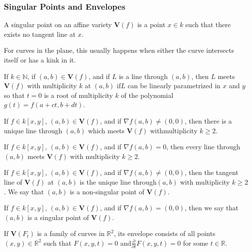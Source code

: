             \subsubsection{Singular Points and Envelopes}
                    \begin{definition}
                    A singular point on an affine variety $\mathbf{V}(f)$ is a point $x\in k$ such that there exists no tangent line at $x$.
                    \end{definition}
                    For curves in the plane, this usually happens when either the curve intersects itself or has a kink in it.
                    \begin{definition}
                    If $k\in \mathbb{N}$, if $(a,b)\in \mathbf{V}(f)$, and if $L$ is a line through $(a,b)$, then $L$ meets $\mathbf{V}(f)$ with multiplicity $k$ at $(a,b)$ if$L$ can be linearly parametrized in $x$ and $y$ so that $t=0$ is a root of multiplicity $k$ of the polynomial $g(t) = f(a+ct,b+dt)$.
                    \end{definition}
                    \begin{theorem}
                    If $f\in k[x,y]$, $(a,b) \in \mathbf{V}(f)$, and if $\nabla f(a,b) \ne (0,0)$, then there is a unique line through $(a,b)$ which meets $\mathbf{V}(f)$ withmultiplicity $k\geq 2$.
                    \end{theorem}
                    \begin{theorem}
                    If $f\in k[x,y]$, $(a,b) \in \mathbf{V}(f)$, and if $\nabla f(a,b) = 0$, then every line through $(a,b)$ meets $\mathbf{V}(f)$ with multiplicity $k \geq 2$.
                    \end{theorem}
                    \begin{definition}
                    If $f\in k[x,y]$, $(a,b) \in \mathbf{V}(f)$, and if $\nabla f(a,b) \ne (0,0)$, then the tangent line of $\mathbf{V}(f)$ at $(a,b)$ is the unique line through$(a,b)$ with multiplicity $k\geq 2$. We say that $(a,b)$ is a non-singular point of $\mathbf{V}(f)$.
                    \end{definition}
                    \begin{definition}
                    If $f\in k[x,y]$, $(a,b) \in \mathbf{V}(f)$, and if $\nabla f(a,b) = (0,0)$, then we say that $(a,b)$ is a singular point of $\mathbf{V}(f)$.
                    \end{definition}
                    \begin{definition}
                    If $\mathbf{V}(F_t)$ is a family of curves in $\mathbb{R}^2$, its envelope consists of all points $(x,y) \in \mathbb{R}^2$ such that $F(x,y,t) = 0$ and$\frac{\partial}{\partial t}F(x,y,t) = 0$ for some $t\in \mathbb{R}$.
                    \end{definition}
